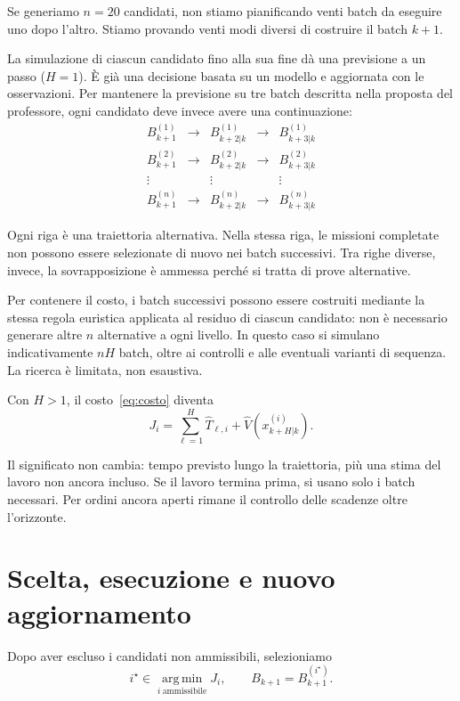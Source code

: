 \documentclass[a4paper,11pt]{article}
\begin{document}
Se generiamo $n=20$ candidati, non stiamo pianificando venti batch da eseguire uno dopo l'altro. Stiamo provando venti modi diversi di costruire il batch $k+1$.

La simulazione di ciascun candidato fino alla sua fine dà una previsione a un passo ($H=1$). È già una decisione basata su un modello e aggiornata con le osservazioni. Per mantenere la previsione su tre batch descritta nella proposta del professore, ogni candidato deve invece avere una continuazione:
\[
\begin{array}{ccccc}
 B_{k+1}^{(1)}&\longrightarrow&B_{k+2|k}^{(1)}&\longrightarrow&B_{k+3|k}^{(1)}\\
 B_{k+1}^{(2)}&\longrightarrow&B_{k+2|k}^{(2)}&\longrightarrow&B_{k+3|k}^{(2)}\\
 \vdots&&\vdots&&\vdots\\
 B_{k+1}^{(n)}&\longrightarrow&B_{k+2|k}^{(n)}&\longrightarrow&B_{k+3|k}^{(n)}
\end{array}
\]

Ogni riga è una traiettoria alternativa. Nella stessa riga, le missioni completate non possono essere selezionate di nuovo nei batch successivi. Tra righe diverse, invece, la sovrapposizione è ammessa perché si tratta di prove alternative.

Per contenere il costo, i batch successivi possono essere costruiti mediante la stessa regola euristica applicata al residuo di ciascun candidato: non è necessario generare altre $n$ alternative a ogni livello. In questo caso si simulano indicativamente $nH$ batch, oltre ai controlli e alle eventuali varianti di sequenza. La ricerca è limitata, non esaustiva.

Con $H>1$, il costo~\eqref{eq:costo} diventa
\begin{equation}
    J_i=\sum_{\ell=1}^{H}\widehat T_{\ell,i}
        +\widehat V(x_{k+H|k}^{(i)}).
\end{equation}

Il significato non cambia: tempo previsto lungo la traiettoria, più una stima del lavoro non ancora incluso. Se il lavoro termina prima, si usano solo i batch necessari. Per ordini ancora aperti rimane il controllo delle scadenze oltre l'orizzonte.

\section{Scelta, esecuzione e nuovo aggiornamento}

Dopo aver escluso i candidati non ammissibili, selezioniamo
\begin{equation}
    i^\star\in\underset{i\ \text{ammissibile}}{\operatorname{arg\,min}}J_i,
    \qquad B_{k+1}=B_{k+1}^{(i^\star)}.
\end{equation}
\end{document}
